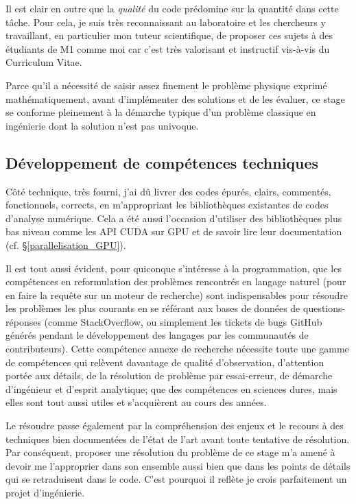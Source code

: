 \documentclass[svgnames,dvipsnames,a4paper,10pt,french]{report}
\begin{document}
Il est clair en outre que la \emph{qualité} du code prédomine sur la quantité dans cette tâche. Pour cela, je suis très reconnaissant au laboratoire et les chercheurs y travaillant, en particulier mon tuteur scientifique, de proposer ces sujets à des étudiants de M1 comme moi car c'est très valorisant et instructif vis-à-vis du Curriculum Vitae.

Parce qu'il a nécessité de saisir assez finement le problème physique exprimé mathématiquement, avant d'implémenter des solutions et de les évaluer, ce stage se conforme pleinement  à la démarche typique d'un problème classique en ingénierie dont la solution n'est pas univoque.


\subsection{Développement de compétences techniques}
Côté technique, très fourni, j'ai dû livrer des codes épurés, clairs, commentés, fonctionnels, corrects, en m'appropriant les bibliothèques existantes de codes d'analyse numérique. Cela a été aussi l'occasion d'utiliser des bibliothèques plus bas niveau comme les API CUDA sur GPU et de savoir lire leur documentation (cf. \S \ref{parallelisation_GPU}).

Il est tout aussi évident, pour quiconque s'intéresse à la programmation, que les compétences en reformulation des problèmes rencontrés en langage naturel (pour en faire la requête sur un moteur de recherche) sont indispensables pour résoudre les problèmes les plus courants en se référant aux bases de données de questions-réponses (comme StackOverflow, ou simplement les tickets de bugs GitHub générés pendant le développement des langages par les communautés de contributeurs). Cette compétence annexe de recherche nécessite toute une gamme de compétences qui relèvent davantage de qualité d'observation, d'attention portée aux détails, de la résolution de problème par essai-erreur, de démarche d'ingénieur et d'esprit analytique; que des compétences en sciences dures, mais elles sont tout aussi utiles et s'acquièrent au cours des années.



Le résoudre passe également par la compréhension des enjeux et le recours à des techniques bien documentées de l'état de l'art avant toute tentative de résolution. Par conséquent, proposer une résolution du problème de ce stage m'a amené à devoir me l'approprier dans son ensemble aussi bien que dans les points de détails qui se retraduisent dans le code. C'est pourquoi il reflète  je crois parfaitement un projet d'ingénierie.
\end{document}
